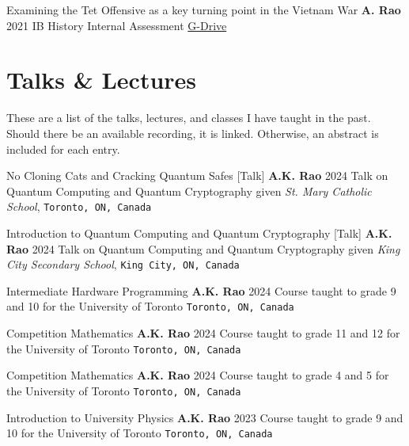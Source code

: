 \documentclass[%
               doublesided,
               paper=a4,
               fontsize=10pt
              ]{my-resume}
\begin{document}
\publication
	{Examining the Tet Offensive as a key turning point in the Vietnam War} %
	{\textbf{A. Rao}} %
	{2021} %
	{IB History Internal Assessment} %
	{\href{https://drive.google.com/file/d/1Mtx6K0ZTZZCAHK1M3TqQMNVC3CZW2h7z/view?usp=sharing}{G-Drive}} %

\section{Talks \& Lectures}
\pubforcefullwidth

These are a list of the talks, lectures, and classes I have taught in the past. Should there be an available recording, it is linked. Otherwise, an abstract is included for each entry.
\bigskip

\publication 
    {No Cloning Cats and Cracking Quantum Safes [Talk]}
    {\textbf{A.K. Rao}}
    {2024}
    {Talk on Quantum Computing and Quantum Cryptography given \textit{St. Mary Catholic School}, \texttt{Toronto, ON, Canada}}
    
\publication 
    {Introduction to Quantum Computing and Quantum Cryptography [Talk]}
    {\textbf{A.K. Rao}}
    {2024}
    {Talk on Quantum Computing and Quantum Cryptography given \textit{King City Secondary School}, \texttt{King City, ON, Canada}}

\publication 
    {Intermediate Hardware Programming}
    {\textbf{A.K. Rao}}
    {2024}
    {Course taught to grade 9 and 10 for the University of Toronto \texttt{Toronto, ON, Canada}}

\publication 
    {Competition Mathematics}
    {\textbf{A.K. Rao}}
    {2024}
    {Course taught to grade 11 and 12 for the University of Toronto \texttt{Toronto, ON, Canada}}
    
\publication 
    {Competition Mathematics}
    {\textbf{A.K. Rao}}
    {2024}
    {Course taught to grade 4 and 5 for the University of Toronto \texttt{Toronto, ON, Canada}}

\publication 
    {Introduction to University Physics}
    {\textbf{A.K. Rao}}
    {2023}
    {Course taught to grade 9 and 10 for the University of Toronto \texttt{Toronto, ON, Canada}}
    

\end{document}
